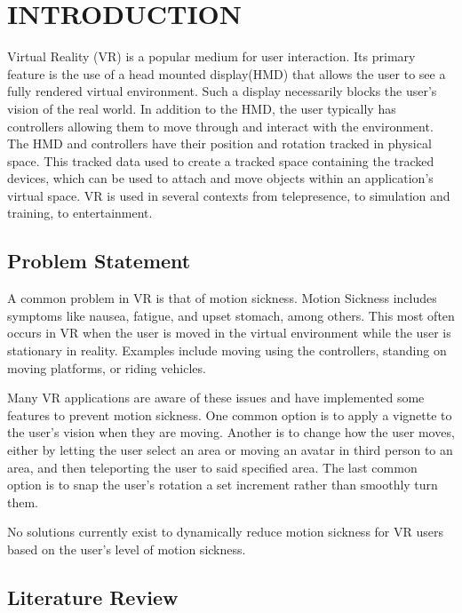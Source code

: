 \chapter{INTRODUCTION}
\label{ch:intro}

Virtual Reality (VR) is a popular medium for user interaction.
Its primary feature is the use of a head mounted display(HMD) that allows the user to see a fully rendered virtual environment.
Such a display necessarily blocks the user's vision of the real world.
In addition to the HMD, the user typically has controllers allowing them to move through and interact with the environment.
The HMD and controllers have their position and rotation tracked in physical space.
This tracked data used to create a tracked space containing the tracked devices, which can be used to attach and move objects within an application's virtual space.
VR is used in several contexts from telepresence\cite{HOANG2023102378}, to simulation and training, to entertainment\cite{Bigscreen}.

\section{Problem Statement}
\label{sec:problem_statement}

A common problem in VR is that of motion sickness.
Motion Sickness includes symptoms like nausea, fatigue, and upset stomach, among others.
This most often occurs in VR when the user is moved in the virtual environment while the user is stationary in reality.
Examples include moving using the controllers, standing on moving platforms, or riding vehicles.

Many VR applications are aware of these issues and have implemented some features to prevent motion sickness.
One common option is to apply a vignette\cite{TunnelingVignette} to the user's vision when they are moving.
Another is to change how the user moves, either by letting the user select an area or moving an avatar in third person to an area, and then teleporting the user to said specified area\cite{TeleportationProvider}.
The last common option is to snap the user's rotation a set increment rather than smoothly turn them\cite{SnapTurn}.

No solutions currently exist to dynamically reduce motion sickness for VR users based on the user's level of motion sickness.

\section{Literature Review}
\label{sec:lit_review}

